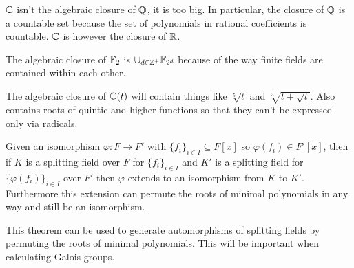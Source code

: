 \documentclass[11pt]{article}
\begin{document}
\begin{example}
  $\mathbb{C}$ isn't the algebraic closure of $\mathbb{Q}$, it is too big. In particular, the closure of $\mathbb{Q}$ is a countable set because the set of polynomials in rational coefficients is countable. $\mathbb{C}$ is however the closure of $\mathbb{R}$.
\end{example}

\begin{example}
  The algebraic closure of $\mathbb{F}_{2}$ is $\cup_{d \in \mathbb{Z}^+} \mathbb{F}_{2^d}$ because of the way finite fields are contained within each other.
\end{example}

\begin{example}
  The algebraic closure of $\mathbb{C}(t)$ will contain things like $\sqrt[5]{t}$ and $\sqrt[3]{t + \sqrt{t}}$. Also contains roots of quintic and higher functions so that they can't be expressed only via radicals.
\end{example}

\begin{theorem}
  Given an isomorphism $\varphi : F \rightarrow F'$ with $\{f_i\}_{i \in I} \subseteq F[x]$ so $\varphi(f_i) \in F'[x]$, then if $K$ is a splitting field over $F$ for $\{f_i\}_{i \in I}$ and $K'$ is a splitting field for $\{\varphi(f_i)\}_{i \in I}$ over $F'$ then $\varphi$ extends to an isomorphism from $K$ to $K'$. Furthermore this extension can permute the roots of minimal polynomials in any way and still be an isomorphism.
\end{theorem}
\begin{remark}
  This theorem can be used to generate automorphisms of splitting fields by permuting the roots of minimal polynomials. This will be important when calculating Galois groups.
\end{remark}
\end{document}
